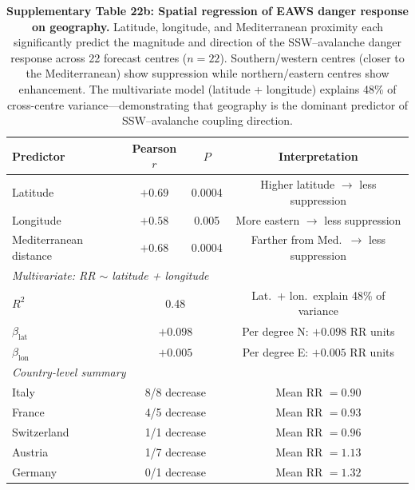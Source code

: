 \documentclass[11pt,letterpaper]{article}
\begin{document}
\begin{table}[!ht]
\centering
\caption{\textbf{Supplementary Table 22b: Spatial regression of EAWS danger response on geography.}
Latitude, longitude, and Mediterranean proximity each significantly predict the magnitude and direction of the SSW--avalanche danger response across 22 forecast centres ($n = 22$). Southern/western centres (closer to the Mediterranean) show suppression while northern/eastern centres show enhancement. The multivariate model (latitude + longitude) explains 48\% of cross-centre variance---demonstrating that geography is the dominant predictor of SSW--avalanche coupling direction.}
\label{tab:eaws_spatial}
\small
\begin{tabular}{lccc}
\toprule
Predictor & Pearson $r$ & $P$ & Interpretation \\
\midrule
Latitude & $+0.69$ & 0.0004 & Higher latitude $\to$ less suppression \\
Longitude & $+0.58$ & 0.005 & More eastern $\to$ less suppression \\
Mediterranean distance & $+0.68$ & 0.0004 & Farther from Med.\ $\to$ less suppression \\
\midrule
\multicolumn{4}{l}{\textit{Multivariate: RR $\sim$ latitude + longitude}} \\
$R^2$ & \multicolumn{2}{c}{0.48} & Lat.\ + lon.\ explain 48\% of variance \\
$\beta_{\mathrm{lat}}$ & \multicolumn{2}{c}{$+0.098$} & Per degree N: $+0.098$ RR units \\
$\beta_{\mathrm{lon}}$ & \multicolumn{2}{c}{$+0.005$} & Per degree E: $+0.005$ RR units \\
\midrule
\multicolumn{4}{l}{\textit{Country-level summary}} \\
Italy & \multicolumn{2}{c}{8/8 decrease} & Mean RR $= 0.90$ \\
France & \multicolumn{2}{c}{4/5 decrease} & Mean RR $= 0.93$ \\
Switzerland & \multicolumn{2}{c}{1/1 decrease} & Mean RR $= 0.96$ \\
Austria & \multicolumn{2}{c}{1/7 decrease} & Mean RR $= 1.13$ \\
Germany & \multicolumn{2}{c}{0/1 decrease} & Mean RR $= 1.32$ \\
\bottomrule
\end{tabular}
\end{table}
\end{document}
